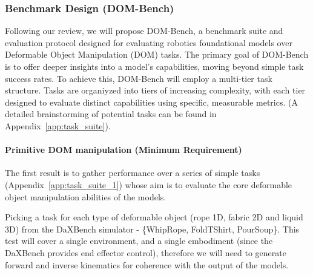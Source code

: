 \subsubsection{Benchmark Design (DOM-Bench)}
Following our review, we will propose DOM-Bench, a benchmark suite and evaluation protocol designed for evaluating robotics foundational models over Deformable Object Manipulation (DOM) tasks. The primary goal of DOM-Bench is to offer deeper insights into a model's capabilities, moving beyond simple task success rates.
To achieve this, DOM-Bench will employ a multi-tier task structure. Tasks are organiyzed into tiers of increasing complexity, with each tier designed to evaluate distinct capabilities using specific, measurable metrics. (A detailed brainstorming of potential tasks can be found in Appendix~\ref{app:task_suite}).

\paragraph{\textbf{Primitive DOM manipulation} (Minimum Requirement)}

The first result is to gather performance over a series of simple tasks (Appendix~\ref{app:task_suite_1}) whose aim is to evaluate the core deformable object manipulation abilities of the models.

\begin{domexample}
Picking a task for each type of deformable object (rope 1D, fabric 2D and liquid 3D) from the DaXBench simulator - \{WhipRope, FoldTShirt, PourSoup\}. This test will cover a single environment, and a single embodiment (since the DaXBench provides end effector control), therefore we will need to generate forward and inverse kinematics for coherence with the output of the models.
\end{domexample}

